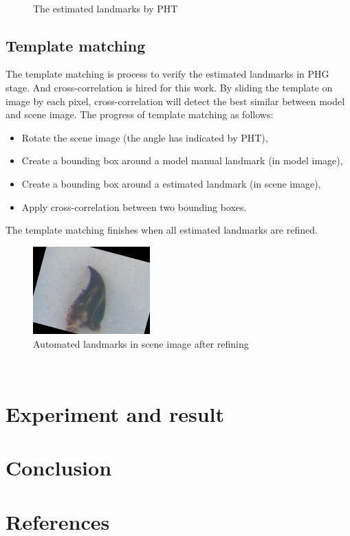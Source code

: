 \documentclass[11pt, twocolumn, a4paper]{article}
\begin{document}
\begin{figure}[h!]
\centering
{}~~
\caption{The estimated landmarks by PHT}
\label{fig:figure_12}
\end{figure}
\subsection{Template matching}
The template matching is process to verify the estimated landmarks in PHG stage. And cross-correlation is hired for this work. By sliding the template on image by each pixel, cross-correlation will detect the best similar between model and scene image. The progress of template matching as follows:
\begin{itemize}
\item Rotate the scene image (the angle has indicated by PHT),
\item Create a bounding box around a model manual landmark (in model image),
\item Create a bounding box around a estimated landmark (in scene image),
\item Apply cross-correlation between two bounding boxes.
\end{itemize}
The template matching finishes when all estimated landmarks are refined.
\begin{figure}[h!]
\centering
\includegraphics[width=0.4\textwidth]{./images/est32}
\caption{Automated landmarks in scene image after refining}
\label{lm_hist}
\end{figure}~\\
\section{Experiment and result}
\section{Conclusion}
\section{References}


\end{document}
